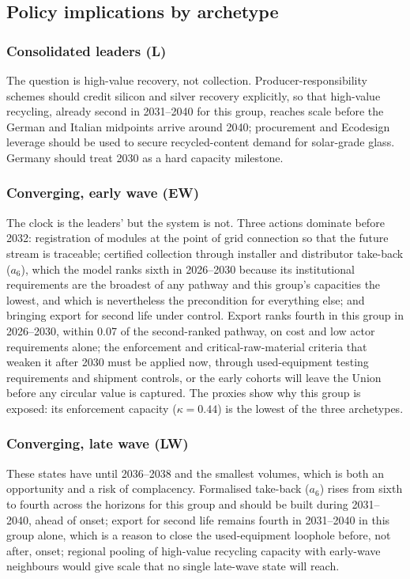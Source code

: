 \documentclass[a4paper,fleqn]{cas-sc}
\begin{document}
\subsection{Policy implications by archetype}
\subsubsection{Consolidated leaders (L)} The question is high-value recovery, not collection. Producer-responsibility schemes should credit silicon and silver recovery explicitly, so that high-value recycling, already second in 2031--2040 for this group, reaches scale before the German and Italian midpoints arrive around 2040; procurement and Ecodesign leverage should be used to secure recycled-content demand for solar-grade glass. Germany should treat 2030 as a hard capacity milestone.

\subsubsection{Converging, early wave (EW)} The clock is the leaders' but the system is not. Three actions dominate before 2032: registration of modules at the point of grid connection so that the future stream is traceable; certified collection through installer and distributor take-back ($a_6$), which the model ranks sixth in 2026--2030 because its institutional requirements are the broadest of any pathway and this group's capacities the lowest, and which is nevertheless the precondition for everything else; and bringing export for second life under control. Export ranks fourth in this group in 2026--2030, within 0.07 of the second-ranked pathway, on cost and low actor requirements alone; the enforcement and critical-raw-material criteria that weaken it after 2030 must be applied now, through used-equipment testing requirements and shipment controls, or the early cohorts will leave the Union before any circular value is captured. The proxies show why this group is exposed: its enforcement capacity ($\kappa=0.44$) is the lowest of the three archetypes.

\subsubsection{Converging, late wave (LW)} These states have until 2036--2038 and the smallest volumes, which is both an opportunity and a risk of complacency. Formalised take-back ($a_6$) rises from sixth to fourth across the horizons for this group and should be built during 2031--2040, ahead of onset; export for second life remains fourth in 2031--2040 in this group alone, which is a reason to close the used-equipment loophole before, not after, onset; regional pooling of high-value recycling capacity with early-wave neighbours would give scale that no single late-wave state will reach.
\end{document}
